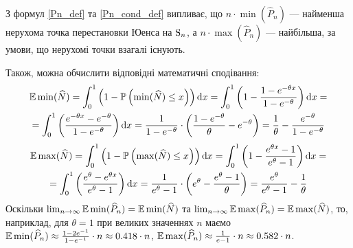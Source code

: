 З формул \eqref{Pn_def} та \eqref{Pn_cond_def} випливає, що
$n \cdot \min(\widehat{P}_n)$ --- найменша нерухома точка
перестановки Юенса на $\mathrm{S}_{n}$, а $n \cdot \max (\widehat{P}_n)$ --- найбільша,
за умови, що нерухомі точки взагалі існують.

Також, можна обчислити відповідні математичні сподівання:
\begin{gather*}
    \mathbb{E}\min(\widehat{N}) = \int_0^1 \left(1 - \mathbb{P}\left(\min(\widehat{N}) \leq x\right)\right) \mathrm{d} x = 
    \int_0^1 \left(1 -  \frac{1-e^{-\theta x}}{1-e^{-\theta}}\right) \mathrm{d} x = \\ =
    \int_0^1 \left(\frac{e^{-\theta x} - e^{-\theta}}{1 - e^{-\theta}}\right) \mathrm{d} x = 
    \frac{1}{1 - e^{-\theta}} \cdot \left(
        \frac{1 - e^{-\theta}}{\theta} - e^{-\theta}
    \right) = 
    \frac{1}{\theta} - \frac{e^{-\theta}}{1 - e^{-\theta}}
\end{gather*}
\begin{gather*}
    \mathbb{E}\max(\widehat{N}) = \int_0^1 \left(1 - \mathbb{P}\left(\max(\widehat{N}) \leq x\right)\right) \mathrm{d} x = 
    \int_0^1 \left(1 -  \frac{e^{\theta x} - 1}{e^{\theta} - 1}\right) \mathrm{d} x = \\ =
    \int_0^1 \left(\frac{e^{\theta} - e^{\theta x}}{e^{\theta} - 1}\right) \mathrm{d} x = 
    \frac{1}{e^{\theta} - 1} \cdot \left(
        e^{\theta} - \frac{e^{\theta} - 1}{\theta}
    \right) = 
    \frac{e^{\theta}}{e^{\theta} - 1} - \frac{1}{\theta}
\end{gather*}
Оскільки $\lim_{n\to\infty} \mathbb{E}\min(\widehat{P}_n) = \mathbb{E}\min(\widehat{N})$ та 
$\lim_{n\to\infty} \mathbb{E}\max(\widehat{P}_n) = \mathbb{E}\max(\widehat{N})$, то, наприклад,
для $\theta = 1$ при великих значеннях $n$ маємо 
$\mathbb{E}\min(\widehat{P}_n) \approx \frac{1 - 2e^{-1}}{1 - e^{-1}} \cdot n \approx 0.418 \cdot n$,
$\mathbb{E}\max(\widehat{P}_n) \approx \frac{1}{e - 1} \cdot n \approx 0.582 \cdot n$.

